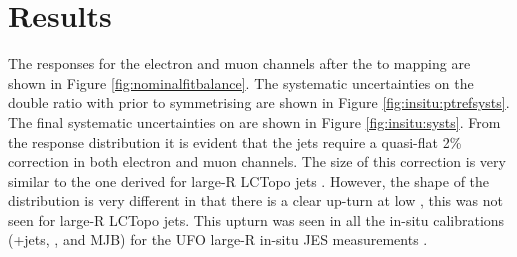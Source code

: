\section{Results\label{sec:insitu:results}}
The responses \rdb for the electron and muon channels after the \ptref to \ptJ mapping are shown in Figure \ref{fig:nominalfitbalance}. The systematic uncertainties on the double ratio with \ptref prior to symmetrising are shown in Figure \ref{fig:insitu:ptrefsysts}. The final systematic uncertainties on \ptJ are shown in Figure \ref{fig:insitu:systs}. From the response distribution it is evident that the jets require a quasi-flat 2\% correction in both electron and muon channels. The size of this correction is very similar to the one derived for large-R LCTopo jets \cite{Atlas:largercali}. However, the shape of the \rdb distribution is very different in that there is a clear up-turn at low \ptJ, this was not seen for large-R LCTopo jets. This upturn was seen in all the in-situ calibrations (\gamma+jets, \zjets, and MJB) for the UFO large-R in-situ JES measurements \cite{Insitu:combination}. 

